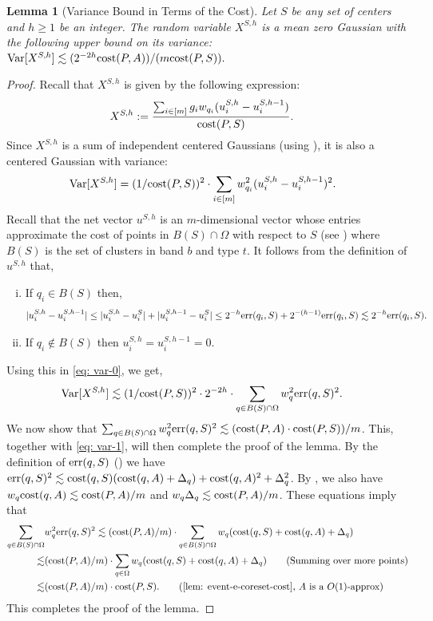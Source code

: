 \documentclass[11pt]{article}
\newtheorem{lemma}{Lemma}[section]
\theoremstyle{restate}
\theoremstyle{definition}
\DeclareMathOperator*{\var}{\mathrm{Var}}
\newcommand{\cost}{\textnormal{cost}}
\newcommand{\uq}[2]{u^{#1}_{#2}} %
\newcommand{\err}{\textnormal{err}}
\begin{document}
\begin{lemma}[Variance Bound in Terms of the Cost]\label{lem: var-first}Let $S$ be any set of centers and $h\geq1$ be an integer. The random variable $X^{S,h}$ is a mean zero Gaussian with the following upper bound on its variance: 
$\var[X^{S,h}] \lesssim (2^{-2h} \cost(P,A))/(m \cost(P,S)).$
\end{lemma}
\begin{proof}
Recall that $X^{S,h}$ is given by the following expression:
\begin{align*}
X^{S,h} :={}& \frac{\sum_{i \in [m]}g_i w_{q_i} (\uq{S,h}{i} - \uq{S,h-1}{i})}{\cost(P,S)}.
\end{align*}
Since $X^{S,h}$ is a sum of independent centered Gaussians (using ), it is also a centered Gaussian with variance: 
\begin{align}\label{eq: var-0}
    &\var[X^{S,h}] = (1/\cost(P,S))^2 \cdot \sum_{i \in [m]}  w_{q_i}^2 (u_i^{S, h} -u_i^{S, h-1})^2 .
\end{align}
Recall that the net vector $u^{S,h}$ is an $m$-dimensional vector whose entries approximate the cost of points in $B(S) \cap \Omega$ with respect to $S$ (see ) where $B(S)$ is the set of clusters in band $b$ and type $t$. It follows from the definition of $u^{S,h}$ that,
\begin{enumerate}[(i)]
    \item If $q_i \in B(S)$ then, 
    $$|u_i^{S,h} - u_i^{S,h-1}| \leq |u_i^{S,h} - u_i^{S}| + |u_i^{S,h-1} - u_i^{S}| \leq 2^{-h} \err(q_i, S) + 2^{-(h-1)} \err(q_i, S)\lesssim 2^{-h} \err(q_i, S).$$
    \item If $q_i \notin B(S)$ then $u_i^{S,h} = u_{i}^{S,h-1} = 0$.
\end{enumerate}  Using this in \eqref{eq: var-0}, we get,
\begin{align}\label{eq: var-1}
    \var[X^{S,h}]&\lesssim (1/\cost(P,S))^2 \cdot 2^{-2h} \cdot   \sum_{q \in B(S) \cap \Omega } w_q^2 \err(q,S)^2.
\end{align}
We now show that $\sum_{q \in B(S) \cap \Omega} w_q^2 \err(q,S)^2 \lesssim (\cost(P,A) \cdot \cost(P,S))/m$. This, together with \eqref{eq: var-1}, will then complete the proof of the lemma.  By the definition of $\err(q,S)$ () we have $\err(q,S)^2 \lesssim \cost(q,S) ( \cost(q,A) + \Delta_q) + \cost(q,A)^2 + \Delta_q^2$. By , we also have $w_q \cost(q,A) \lesssim \cost(P,A)/m$ and $w_q \Delta_q \lesssim \cost(P,A)/m$. These equations imply that
\begin{align}
\nonumber
\sum_{q \in B(S) \cap \Omega} &w_q^2 \err(q,S)^2 
\lesssim  (\cost(P,A)/m) \cdot \sum_{q \in B(S) \cap  \Omega}  w_q  (\cost(q,S)  + \cost(q,A) + \Delta_q) 
  \\
\lesssim & (\cost(P,A)/m) \cdot \sum_{q \in  \Omega}  w_q  (\cost(q,S)  + \cost(q,A) + \Delta_q)  \tag{Summing over more points}\nonumber\\
\lesssim & (\cost(P,A)/m) \cdot \cost(P,S). \tag{\cref{lem: event-e-coreset-cost}, $A$ is a $O(1)$-approx}
\end{align}
This completes the proof of the lemma.
\end{proof}
\end{document}
